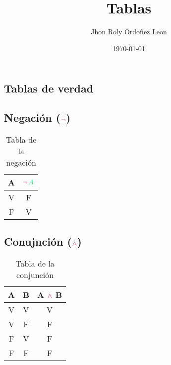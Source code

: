 \documentclass[11pt, a4paper]{article}
\title{Tablas}
\author{Jhon Roly Ordoñez Leon}
\date{\today}
\begin{document}
    \maketitle
    \newpage
    \textcolor{rojo1}{\section{ Tablas de verdad } }
 
    \textcolor{violeta1}{\subsection{\textbf{Negación ($\textcolor{rojo1}{\neg}$)}}}
    \begin{table}[ht]
        \begin{center}
            \caption{Tabla de la negación }
            \vspace{4mm}
            \begin{tabular}{c|c}
                \textcolor{verde1}{A} & $ \textcolor{rojo1}{\neg} \,  \textcolor{verde1}{A} $ \\
                \hline 
                \textcolor{naranja1}{V} & \textcolor{azul1}{F}  \\
                \textcolor{azul1}{F}  & \textcolor{naranja1}{V}
            \end{tabular}
        \end{center}
    \end{table}
    \textcolor{violeta1}{\subsection{\textbf{Conujnción ($\textcolor{rojo1}{\land}$)}}}
    \begin{table}[ht]
        \begin{center}
            \caption{Tabla de la conjunción}
            \vspace{4mm}
        \begin{tabular}{c c| c}
            \textcolor{verde1}{A} & \textcolor{violeta1}{B} & \textcolor{verde1}{A} $\textcolor{rojo1}{\land} $ \textcolor{violeta1}{B} \\
            \hline 
            \textcolor{naranja1}{V} & \textcolor{naranja1}{V} & \textcolor{naranja1}{V} \\
            \textcolor{naranja1}{V} & \textcolor{azul1}{F}  & \textcolor{azul1}{F} \\
            \textcolor{azul1}{F}  & \textcolor{naranja1}{V} & \textcolor{azul1}{F} \\
            \textcolor{azul1}{F} & \textcolor{azul1}{F} & \textcolor{azul1}{F}\\
        \end{tabular}
        \end{center}
    \end{table}
\end{document}
